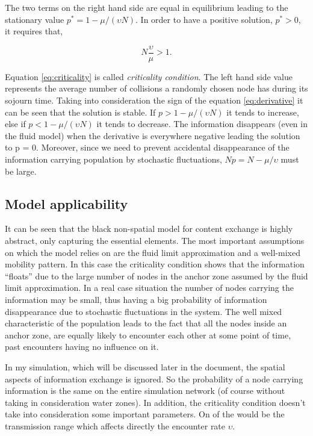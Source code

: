 The two terms on the right hand side are equal in equilibrium leading to the
stationary value $p^* = 1 - \mu / (\upsilon N)$. In order to have a positive
solution, $p^* > 0$, it requires that,

\begin{equation}
N\frac{\upsilon}{\mu} > 1. \label{eq:criticality}
\end{equation}

Equation \eqref{eq:criticality} is called {\it criticality condition}. The left
hand side value represents the average number of collisions a randomly chosen
node has during its sojourn time. Taking into consideration the sign of
the equation \eqref{eq:derivative} it can be seen that the solution is stable.
If $p > 1 - \mu / (\upsilon N)$ it tends to increase, else if $p < 1 - \mu /
(\upsilon N)$ it tends to decrease. The information disappears (even in the
fluid model) when the derivative is everywhere negative leading the solution to
p = 0. Moreover, since we need to prevent accidental disappearance of the
information carrying population by stochastic fluctuations, $Np = N - \mu /
\upsilon$ must be large.

\subsection{Model applicability}

It can be seen that the black non-spatial model for content exchange is highly
abstract, only capturing the essential elements. The most important assumptions
on which the model relies on are the fluid limit approximation and a well-mixed
mobility pattern. In this case the criticality condition shows that the
information ``floats'' due to the large number of nodes in the anchor zone
assumed by the fluid limit approximation. In a real case situation the number of
nodes carrying the information may be small, thus having a big probability of
information disappearance due to stochastic fluctuations in the system. The well
mixed characteristic of the population leads to the fact that all the nodes
inside an anchor zone, are equally likely to encounter each other at some point
of time, past encounters having no influence on it.

In my simulation, which will be discussed later in the document, the spatial
aspects of information exchange is ignored. So the probability of a node
carrying information is the same on the entire simulation network (of course
without taking in consideration water zones). In addition, the criticality
condition doesn't take into consideration some important parameters. On of the
would be the transmission range which affects directly the encounter rate
$\upsilon$.

